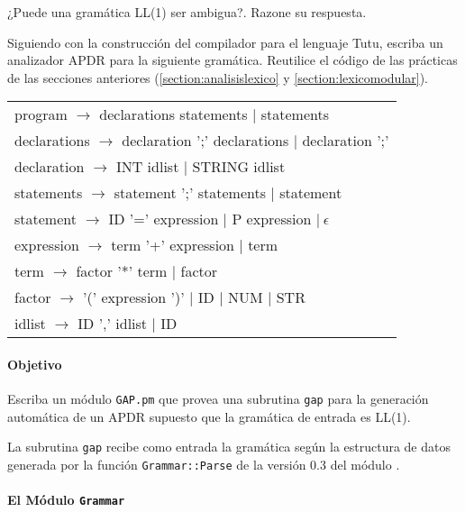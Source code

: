 ¿Puede una gramática LL(1) ser ambigua?.
Razone su respuesta.

\label{practica:APDR}

Siguiendo con la construcción del compilador para el lenguaje Tutu, escriba un 
analizador APDR para la siguiente gramática. Reutilice el código de las
prácticas de las secciones anteriores 
(\ref{section:analisislexico}
y
\ref{section:lexicomodular}).

\vspace{0.5cm}
\begin{tabular}{l}
program      $\rightarrow$  declarations  statements         $|$ statements\\
declarations $\rightarrow$ declaration  ';'  declarations    $|$ declaration ';'\\
declaration  $\rightarrow$ INT  idlist                       $|$ STRING   idlist\\
statements   $\rightarrow$ statement  ';'  statements        $|$ statement\\
statement    $\rightarrow$ ID '=' expression                 $|$ P  expression $|\ \epsilon$\\
expression   $\rightarrow$ term '+' expression               $|$ term\\
term         $\rightarrow$ factor '*' term                   $|$ factor\\
factor       $\rightarrow$ '(' expression ')' $|$ ID $|$ NUM $|$ STR\\
idlist       $\rightarrow$ ID ',' idlist $|$ ID
\end{tabular}
\vspace{0.25cm}

\label{practica:GAP}

\paragraph{Objetivo}
Escriba un módulo \verb|GAP.pm| que provea una subrutina \verb|gap| para
la generación automática de un APDR supuesto que la gramática de entrada es 
LL(1). 

La subrutina \verb|gap| recibe como entrada la gramática según la estructura de
datos generada  por la función \verb|Grammar::Parse| de la versión 0.3 del módulo
. 

\paragraph{El Módulo {\tt Grammar}}

